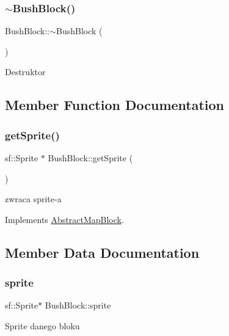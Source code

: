 \subsubsection{\texorpdfstring{$\sim$\+Bush\+Block()}{~BushBlock()}}
{\footnotesize\ttfamily Bush\+Block\+::$\sim$\+Bush\+Block (\begin{DoxyParamCaption}{ }\end{DoxyParamCaption})}

Destruktor 

\subsection{Member Function Documentation}
\mbox{\label{class_bush_block_ac6346ab038665e207134bb68ab3f20a1}} 
\subsubsection{\texorpdfstring{get\+Sprite()}{getSprite()}}
{\footnotesize\ttfamily sf\+::\+Sprite $\ast$ Bush\+Block\+::get\+Sprite (\begin{DoxyParamCaption}{ }\end{DoxyParamCaption})\hspace{0.3cm}{\ttfamily [virtual]}}

zwraca sprite-\/a 

Implements \hyperlink{class_abstract_map_block_ab5a448a1b6478d10a8814c6d19c4fdb4}{Abstract\+Map\+Block}.



\subsection{Member Data Documentation}
\mbox{\label{class_bush_block_a24bfc3a63232d1466d9c5ddb7459cf55}} 
\subsubsection{\texorpdfstring{sprite}{sprite}}
{\footnotesize\ttfamily sf\+::\+Sprite$\ast$ Bush\+Block\+::sprite\hspace{0.3cm}{\ttfamily [protected]}}

Sprite danego bloku \mbox{\label{class_bush_block_af04c47ff2490b42258b0b56a6dc1aabe}} 
